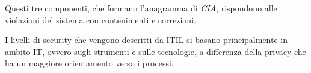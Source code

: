 		Questi tre componenti, che formano l'anagramma di \textit{CIA}, rispondono alle violazioni  del sistema con contenimenti e correzioni.
		
		I livelli di security che vengono descritti da ITIL si basano principalmente in ambito IT, ovvero sugli strumenti e sulle tecnologie, a differenza della privacy che ha un maggiore orientamento verso i processi.